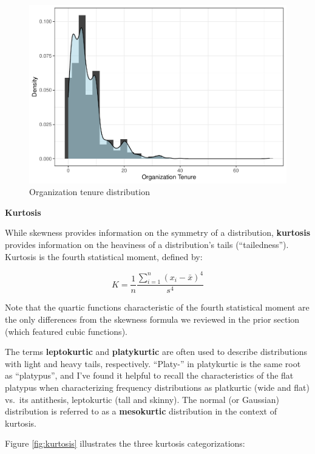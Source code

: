 \documentclass[
]{book}
\begin{document}
\begin{figure}

{\centering \includegraphics{The_Fundamentals_of_People_Analytics_files/figure-latex/org-tenure-distribution-1} 

}

\caption{Organization tenure distribution}\label{fig:org-tenure-distribution}
\end{figure}

\textbf{Kurtosis}

While skewness provides information on the symmetry of a distribution, \textbf{kurtosis} provides information on the heaviness of a distribution's tails (``tailedness''). Kurtosis is the fourth statistical moment, defined by:

\[ K = \frac{1}{n} \frac{\displaystyle\sum_{i=1}^{n} (x_i-\bar{x})^4}{s^4} \]

Note that the quartic functions characteristic of the fourth statistical moment are the only differences from the skewness formula we reviewed in the prior section (which featured cubic functions).

The terms \textbf{leptokurtic} and \textbf{platykurtic} are often used to describe distributions with light and heavy tails, respectively. ``Platy-'' in platykurtic is the same root as ``platypus'', and I've found it helpful to recall the characteristics of the flat platypus when characterizing frequency distributions as platkurtic (wide and flat) vs.~its antithesis, leptokurtic (tall and skinny). The normal (or Gaussian) distribution is referred to as a \textbf{mesokurtic} distribution in the context of kurtosis.

Figure \ref{fig:kurtosis} illustrates the three kurtosis categorizations:
\end{document}
